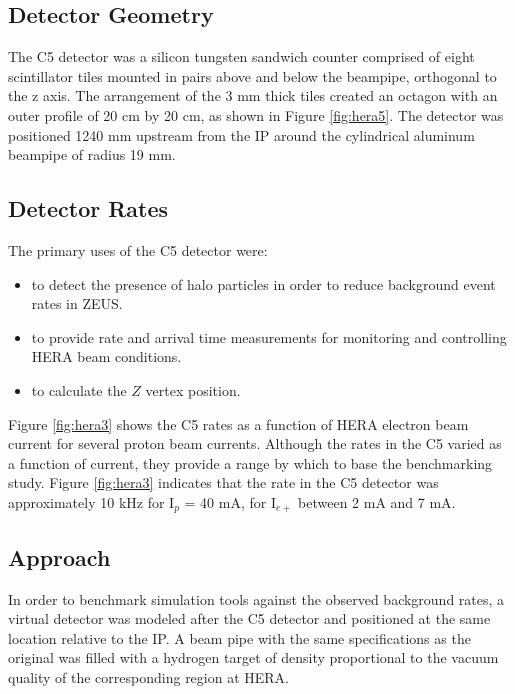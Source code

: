 \subsection{Detector Geometry}

The C5 detector was a silicon tungsten sandwich counter comprised of eight scintillator tiles mounted in pairs above and below the beampipe, orthogonal to the z axis.  The arrangement of the 3 mm thick tiles created an octagon with an outer profile of 20 cm by 20 cm, as shown in Figure \ref{fig:hera5}.  The detector was positioned 1240 mm upstream from the IP around the cylindrical aluminum beampipe of radius 19 mm.  

\subsection{Detector Rates}
The primary uses of the C5 detector were:
\begin{itemize}
	\item to detect the presence of halo particles in order to reduce background event rates in ZEUS.
	\item to provide rate and arrival time measurements for monitoring and controlling HERA beam conditions.
	\item to calculate the $Z$ vertex position.
\end{itemize}
Figure \ref{fig:hera3} shows the C5 rates as a function of HERA electron beam current for several proton beam currents.  Although the rates in the C5 varied as a function of current, they provide a range by which to base the benchmarking study.  Figure \ref{fig:hera3} indicates that the rate in the C5 detector was approximately 10 kHz for I$_{p}$ = 40 mA, for I$_{e+}$ between 2 mA and 7 mA. 

\subsection{Approach}

In order to benchmark simulation tools against the observed background rates, a virtual detector was modeled after the C5 detector and positioned at the same location relative to the IP.  A beam pipe with the same specifications as the original was filled with a hydrogen target of density proportional to the vacuum quality of the corresponding region at HERA.  

